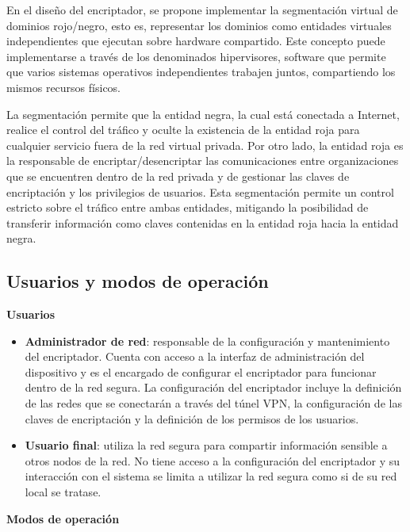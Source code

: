 En el diseño del encriptador, se propone implementar la segmentación virtual de dominios rojo/negro, esto es, representar los dominios como entidades virtuales independientes que ejecutan sobre hardware compartido. Este concepto puede implementarse a través de los denominados hipervisores, software que permite que varios sistemas operativos independientes trabajen juntos, compartiendo los mismos recursos físicos.

La segmentación permite que la entidad negra, la cual está conectada a Internet, realice el control del tráfico y oculte la existencia de la entidad roja para cualquier servicio fuera de la red virtual privada. Por otro lado, la entidad roja es la responsable de encriptar/desencriptar las comunicaciones entre organizaciones que se encuentren dentro de la red privada y de gestionar las claves de encriptación y los privilegios de usuarios. Esta segmentación permite un control estricto sobre el tráfico entre ambas entidades, mitigando la posibilidad de transferir información como claves contenidas en la entidad roja hacia la entidad negra.


\subsection{Usuarios y modos de operación}

\begin{center}
    \textbf{Usuarios}
\end{center}

\begin{itemize}
    \item \textbf{Administrador de red}: responsable de la configuración y mantenimiento del encriptador. Cuenta con acceso a la interfaz de administración del dispositivo y es el encargado de configurar el encriptador para funcionar dentro de la red segura. La configuración del encriptador incluye la definición de las redes que se conectarán a través del túnel VPN, la configuración de las claves de encriptación y la definición de los permisos de los usuarios.
    \item \textbf{Usuario final}: utiliza la red segura para compartir información sensible a otros nodos de la red. No tiene acceso a la configuración del encriptador y su interacción con el sistema se limita a utilizar la red segura como si de su red local se tratase.
\end{itemize}

\begin{center}
    \textbf{Modos de operación}
\end{center}

